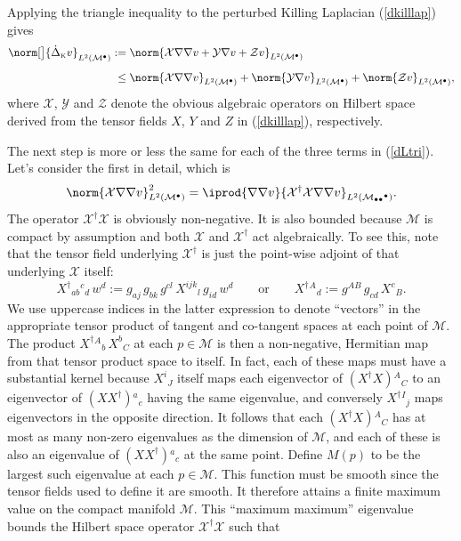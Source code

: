 \documentclass[12pt,letterpaper]{iopart}
\newcommand\dLap[1][K]{\dot\Delta_{\scriptscriptstyle\mathrm{#1}}}
\newcommand\M{\mathcal{M}}
\newcommand\X{\mathcal{X}}
\newcommand\Y{\mathcal{Y}}
\newcommand\Z{\mathcal{Z}}
\newcommand\ind{{\bullet}}
\begin{document}
Applying the triangle inequality to the perturbed Killing Laplacian (\ref{dkilllap}) gives 
%
\begin{align}\label{dLtri}
	\norm[\big]{\dLap v}_{L^2(\M^\ind)} 
		:={}&{} \norm{\X \grad \grad v + \Y \grad v + \Z v}_{L^2(\M^\ind)}
			\notag\\[1ex]
		\le{}&{} \norm{\X \grad \grad v}_{L^2(\M^\ind)} 
			+ \norm{\Y \grad v}_{L^2(\M^\ind)} 
			+ \norm{\Z v}_{L^2(\M^\ind)}, 
\end{align}
%
where $\X$, $\Y$ and $\Z$ denote the obvious algebraic operators on Hilbert space derived from the tensor fields $X$, $Y$ and $Z$ in (\ref{dkilllap}), respectively.

The next step is more or less the same for each of the three terms in (\ref{dLtri}).  Let's consider the first in detail, which is 
%
\begin{equation}\label{dLXadj}
	\norm{\X \grad \grad v}^2_{L^2(\M^\ind)}
		= \iprod{\grad \grad v}{\X^\dagger \X \grad \grad v}_{L^2(\M_{\ind \ind}{}^\ind)}.
\end{equation}
%
The operator $\X^\dagger \X$ is obviously non-negative.  It is also bounded because $\M$ is compact by assumption and both $\X$ and $\X^\dagger$ act algebraically.  To see this, note that the tensor field underlying $\X^\dagger$ is just the point-wise adjoint of that underlying $\X$ itself: 
%
\begin{equation}
	X^\dagger{}_{ab}{}^c{}_d\, w^d := g_{aj}\, g_{bk}\, g^{cl}\, X^{ijk}{}_l\, g_{id}\, w^d
	\qquad\text{or}\qquad
	X^\dagger{}^A{}_d := g^{AB}\, g_{cd}\, X^c{}_B.
\end{equation}
%
We use uppercase  indices in the latter expression to denote ``vectors'' in the appropriate tensor product of tangent and co-tangent spaces at each point of $\M$.  The product $X^\dagger{}^A{}_b\, X^b{}_C$ at each $p \in \M$ is then a non-negative, Hermitian map from that tensor product space to itself.  In fact, each of these maps must have a substantial kernel because $X^i{}_J$ itself maps each eigenvector of $(X^\dagger X){}^A{}_C$ to an eigenvector of $(X X^\dagger){}^a{}_c$ having the same eigenvalue, and conversely $X^\dagger{}^I{}_j$ maps eigenvectors in the opposite direction.  It follows that each $(X^\dagger X){}^A{}_C$ has at most as many non-zero eigenvalues as the dimension of $\M$, and each of these is also an eigenvalue of $(X X^\dagger){}^a{}_c$ at the same point.  Define $M(p)$ to be the largest such eigenvalue at each $p \in \M$.  This function must be smooth since the tensor fields used to define it are smooth.  It therefore attains a finite maximum value on the compact manifold $\M$.  This ``maximum maximum'' eigenvalue bounds the Hilbert space operator $\X^\dagger \X$ such that 
\end{document}
